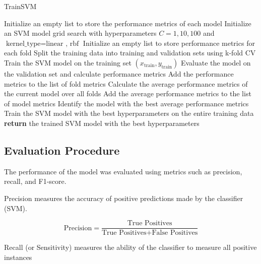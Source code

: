 \documentclass[11pt,article,oneside]{article}
\begin{document}
\begin{algorithm}
    \caption{TrainSVM}
    \begin{algorithmic}[1]
            \State Initialize an empty list to store the performance metrics of each model
                    \State Initialize an SVM model grid search with hyperparameters $C = 1, 10, 100$ and $\text{kernel\_type} = \text{linear , rbf}$
                    \State Initialize an empty list to store performance metrics for each fold
                        \State Split the training data into training and validation sets using k-fold CV
                        \State Train the SVM model on the training set $(x_{\text{train}}, y_{\text{train}})$
                        \State Evaluate the model on the validation set and calculate performance metrics
                        \State Add the performance metrics to the list of fold metrics
                    \EndFor
                    \State Calculate the average performance metrics of the current model over all folds
                    \State Add the average performance metrics to the list of model metrics
                \EndFor
            \EndFor
            \State Identify the model with the best average performance metrics
            \State Train the SVM model with the best hyperparameters on the entire training data
            \State \textbf{return} the trained SVM model with the best hyperparameters
        \EndProcedure
    \end{algorithmic}
    \end{algorithm}
        

\subsection{Evaluation Procedure}
The performance of the model was evaluated using metrics such as precision, recall, and F1-score. 

Precision measures the accuracy of positive predictions made by the classifier (SVM). 

\[
\text{Precision} = \frac{\text{True Positives}}{\text{True Positives} + \text{False Positives}}
\]

Recall (or Sensitivity) measures the ability of the classifier to measure all positive instances 
\end{document}
